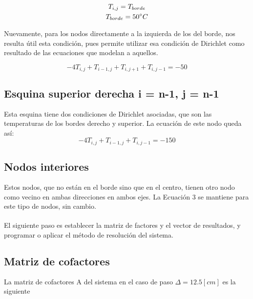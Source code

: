 \documentclass[12pt, notitlepage]{article}
\begin{document}
\begin{gather*}
T_{i,j} = T_{borde} \\
T_{borde} = 50\degree C
\end{gather*}

Nuevamente, para los nodos directamente a la izquierda de los del borde, nos resulta útil esta condición, pues permite utilizar esa condición de Dirichlet como resultado de las ecuaciones que modelan a aquellos.

\begin{equation*}
-4T_{i,j} + T_{i-1,j} + T_{i,j+1} + T_{i,j-1} = -50
\end{equation*}

\subsection{Esquina superior derecha i = n-1, j = n-1}
Esta esquina tiene dos condiciones de Dirichlet asociadas, que son las temperaturas de los bordes derecho y superior. La ecuación de este nodo queda así:
\begin{equation}
-4T_{i,j} + T_{i-1,j} + T_{i,j-1} = -150
\end{equation}

\subsection{Nodos interiores}
Estos nodos, que no están en el borde sino que en el centro, tienen otro nodo como vecino en ambas direcciones en ambos ejes. La Ecuación 3 se mantiene para este tipo de nodos, sin cambio.\\\\
El siguiente paso es establecer la matriz de factores y el vector de resultados, y programar o aplicar el método de resolución del sistema.

\subsection{Matriz de cofactores}
La matriz de cofactores A del sistema en el caso de paso $\Delta = 12.5 [cm]$ es la siguiente
\end{document}

